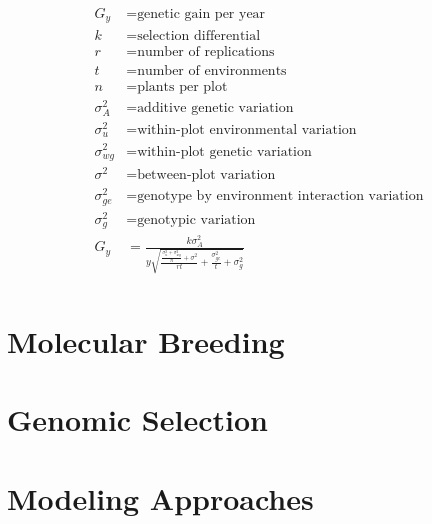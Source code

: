 \begin{equation} \label{gentic_gain}
\begin{split}
    G_y           &= \textrm{genetic gain per year} \\
    k             &= \textrm{selection differential} \\
    r             &= \textrm{number of replications} \\
    t             &= \textrm{number of environments} \\
    n             &= \textrm{plants per plot} \\
    \sigma^2_{A}  &= \textrm{additive genetic variation} \\
    \sigma^2_{u}  &= \textrm{within-plot environmental variation} \\
    \sigma^2_{wg} &= \textrm{within-plot genetic variation} \\
    \sigma^2      &= \textrm{between-plot variation} \\
    \sigma^2_{ge} &= \textrm{genotype by environment interaction variation} \\
    \sigma^2_{g}  &= \textrm{genotypic variation} \\
    G_y           &= \frac{k\sigma^2_A}{y \sqrt{ \frac{\frac{\sigma^2_{u} + \sigma^2_{wg}}{n} + \sigma^2}{rt} + \frac{\sigma^2_{ge}}{t} + \sigma^2_{g} }} \\
\end{split}
\end{equation}

\section{Molecular Breeding}
\blindtext
\section{Genomic Selection}
\blindtext
\section{Modeling Approaches}
\blindenumerate
\blindtext
